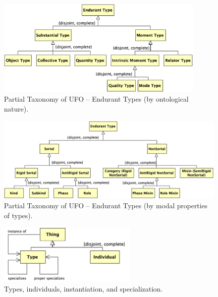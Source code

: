 \documentclass{article}
\newcommand{\BeginEndurantTaxonomyOfNaturesBegin}{149}
\newcommand{\EndEndurantTaxonomyOfNaturesEnd}{194}
\newcommand{\BeginEndurantTaxonomyOfPropertiesBegin}{196}
\newcommand{\EndEndurantTaxonomyOfPropertiesEnd}{273}
\begin{document}
\begin{figure}[ht]
    \centering
    \includegraphics[width=0.9\textwidth]{diagrams/Endurant_Type_Natures_Diagram.png}
    \caption{Partial Taxonomy of UFO -- Endurant Types (by ontological nature).}
    \label{fig:ufo_taxonomy_endurant_types_natures}
\end{figure}




\begin{figure}[ht]
    \centering
    \includegraphics[width=\textwidth]{diagrams/Endurant_Type_Properties_Diagram.png}
    \caption{Partial Taxonomy of UFO -- Endurant Types (by modal properties of types).}
    \label{fig:ufo_taxonomy_endurant_types_properties}
\end{figure}




\begin{figure}[ht]
    \centering
    \includegraphics[width=0.6\textwidth]{diagrams/Instantiation_Diagram.png}
    \caption{Types, individuals, instantiation, and specialization.}
    \label{fig:instantiation_and_specialization}
\end{figure}
\end{document}
